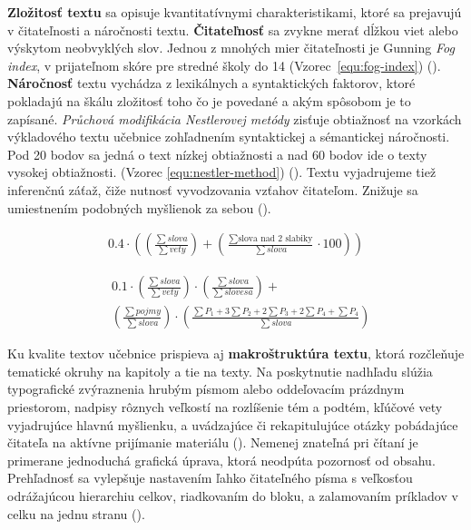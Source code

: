\textbf{Zložitosť textu} sa opisuje kvantitatívnymi charakteristikami, ktoré sa prejavujú v čitateľnosti a náročnosti textu. \textbf{Čitateľnosť} sa zvykne merať dĺžkou viet alebo výskytom neobvyklých slov. Jednou z mnohých mier čitateľnosti je Gunning \emph{Fog index}, v prijateľnom skóre pre stredné školy do 14 (Vzorec~\ref{equ:fog-index}) (\cite{drahosova_hodnotenie_2014}). \textbf{Náročnosť} textu vychádza z lexikálnych a syntaktických faktorov, ktoré pokladajú na škálu zložitosť toho čo je povedané a akým spôsobom je to zapísané. \emph{Průchová modifikácia Nestlerovej metódy} zisťuje obtiažnosť na vzorkách výkladového textu učebnice zohľadnením syntaktickej a sémantickej náročnosti. Pod 20 bodov sa jedná o text nízkej obtiažnosti a nad 60 bodov ide o texty vysokej obtiažnosti. (Vzorec \ref{equ:nestler-method}) (\cite{drahosova_hodnotenie_2014}). Textu vyjadrujeme tiež inferenčnú záťaž, čiže nutnosť vyvodzovania vzťahov čitateľom. Znižuje sa umiestnením podobných myšlienok za sebou (\cite{pavlovkin_ziak_1989}).

\begin{ceqn}\begin{align}
0.4 \cdot \left(\left(\frac{\sum slova}{\sum vety}\right) + 
\left(\frac{\sum \text{slova nad 2 slabiky}}{\sum slova}\cdot 100\right)\right)
\label{equ:fog-index}
\end{align}\end{ceqn}

\begin{equation}\begin{split}
& 0.1 \cdot \left(\frac{\sum slova}{\sum vety}\right) \cdot  \left(\frac{\sum slova}{\sum slovesa}\right) + \\
& \left(\frac{\sum pojmy}{\sum slova}\right) \cdot \left(\frac{\sum P_1 + 3\sum P_2 + 2\sum P_3 + 2\sum P_4 + \sum P_4}{\sum slova}\right)
\label{equ:nestler-method}
\end{split}\end{equation}

Ku kvalite textov učebnice prispieva aj \textbf{makroštruktúra textu}, ktorá rozčleňuje tematické okruhy na kapitoly a tie na texty. Na poskytnutie nadhľadu slúžia typografické zvýraznenia hrubým písmom alebo oddeľovacím prázdnym priestorom, nadpisy rôznych veľkostí na rozlíšenie tém a podtém, kľúčové vety vyjadrujúce hlavnú myšlienku, a uvádzajúce či rekapitulujúce otázky pobádajúce čitateľa na aktívne prijímanie materiálu (\cite{pavlovkin_ziak_1989}). Nemenej znateľná pri čítaní je primerane jednoduchá grafická úprava, ktorá neodpúta pozornosť od obsahu. Prehľadnosť sa vylepšuje nastavením ľahko čitateľného písma s veľkosťou odrážajúcou hierarchiu celkov, riadkovaním do bloku, a zalamovaním príkladov v celku na jednu stranu (\cite{mlady_tvorba_1988}).

